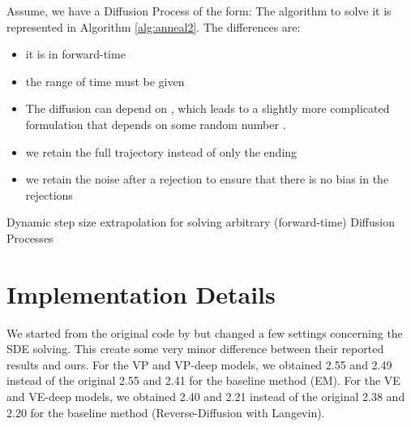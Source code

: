 \documentclass{article}
\begin{document}
Assume, we have a Diffusion Process of the form: 
The algorithm to solve it is represented in Algorithm \ref{alg:anneal2}. The differences are:
\begin{itemize}
    \item it is in forward-time
    \item the range of time must be given
    \item The diffusion can depend on , which leads to a slightly more complicated formulation that depends on some random number  \citep{roberts2012modify}.
    \item we retain the full trajectory instead of only the ending
    \item we retain the noise after a rejection to ensure that there is no bias in the rejections
\end{itemize}

\begin{algorithm}[H]
	\caption{Dynamic step size extrapolation for solving arbitrary (forward-time) Diffusion Processes}
	\label{alg:anneal2}
	\begin{algorithmic}
	    \Require{}
        \State{}
        \State{}
        \State{}
        \While{}
                \State{}
            \Else{} 
            \EndIf
            \State{} 
            \State{}
            \State{} 
            \State{} 
            \State{}
            \If{} 
                \State{}
                \State{} 
                \State{}
            \EndIf
{}
        \EndWhile
        \Return{}
        
	\end{algorithmic}
\end{algorithm}


\clearpage

\section{Implementation Details} \label{sec:changes}

We started from the original code by \citet{song2020score} but changed a few settings concerning the SDE solving. This create some very minor difference between their reported results and ours. For the VP and VP-deep models, we obtained 2.55 and 2.49 instead of the original 2.55 and 2.41 for the baseline method (EM). For the VE and VE-deep models, we obtained 2.40 and 2.21 instead of the original 2.38 and 2.20 for the baseline method (Reverse-Diffusion with Langevin).
\end{document}
